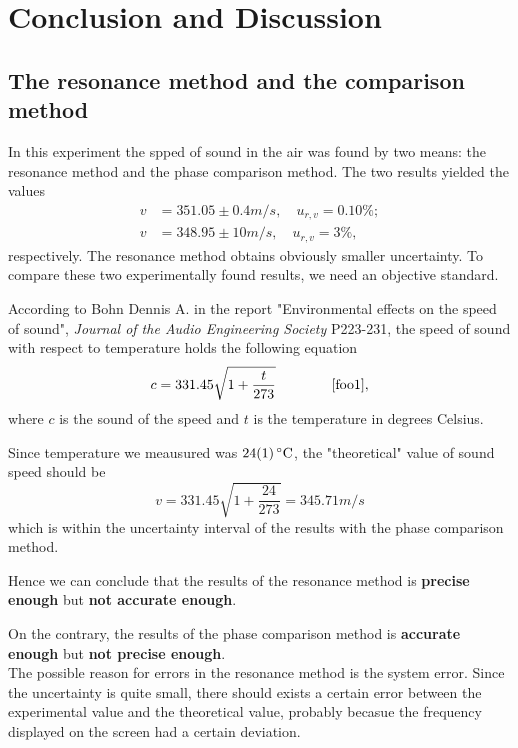 \section{Conclusion and Discussion}

\subsection{The resonance method and the comparison method}
    In this experiment the spped of sound in the air was found by two means: the resonance method and the phase comparison method. The two results yielded the values
    \begin{equation}\label{res}
    \begin{split}
        v&=351.05\pm0.4 m/s,\quad u_{r,v}=0.10\%;\\
        v&=348.95\pm10 m/s,\quad u_{r,v}=3\%,
    \end{split}
    \end{equation}
    respectively. The resonance method obtains obviously smaller uncertainty. To compare these two experimentally found results, we need an objective standard.

    According to Bohn Dennis A. in the report "Environmental effects on the speed of sound", \emph{Journal of the Audio Engineering Society} P223-231, the speed of sound with respect to temperature holds the following equation
    \[
        c=331.45\sqrt{1+\frac{t}{273}}\quad\quad\quad\quad\cite{foo1},
    \]
    where $c$ is the sound of the speed and $t$ is the temperature in degrees Celsius.

    Since temperature we meausured was $\SI{24\pm1}{\degreeCelsius}$, the "theoretical" value of sound speed should be
    \[
        v=331.45\sqrt{1+\frac{24}{273}}=345.71m/s
    \]
    which is within the uncertainty interval of the results with the phase comparison method.

    Hence we can conclude that the results of the resonance method is \textbf{precise enough} but \textbf{not accurate enough}. 
    
    On the contrary, the results of the phase comparison method is \textbf{accurate enough} but \textbf{not precise enough}.\\

    The possible reason for errors in the resonance method is the system error. Since the uncertainty is quite small, there should exists a certain error between the experimental value and the theoretical value, probably becasue the frequency displayed on the screen had a certain deviation.

